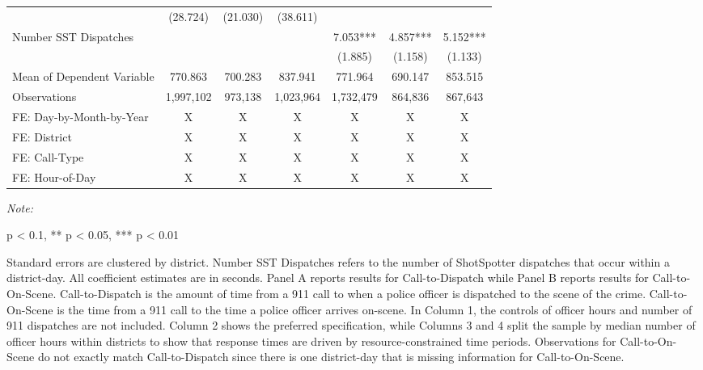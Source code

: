 \begin{table}[H]
\begin{threeparttable}
\begin{tabular}[t]{lcccccc}
\hspace{1em} & (28.724) & (21.030) & (38.611) &  &  & \\
\hspace{1em}Number SST Dispatches &  &  &  & 7.053*** & 4.857*** & 5.152***\\
\hspace{1em} &  &  &  & (1.885) & (1.158) & (1.133)\\
\hspace{1em}Mean of Dependent Variable & 770.863 & 700.283 & 837.941 & 771.964 & 690.147 & 853.515\\
\hspace{1em}Observations & 1,997,102 & 973,138 & 1,023,964 & 1,732,479 & 864,836 & 867,643\\
\midrule
FE: Day-by-Month-by-Year & X & X & X & X & X & X\\
FE: District & X & X & X & X & X & X\\
FE: Call-Type & X & X & X & X & X & X\\
FE: Hour-of-Day & X & X & X & X & X & X\\
\bottomrule
\end{tabular}
\begin{tablenotes}
\item \textit{Note: } 
\item * p < 0.1, ** p < 0.05, *** p < 0.01
\item Standard errors are clustered by district.                       Number SST Dispatches refers to the number of                      ShotSpotter dispatches that occur within a district-day.                      All coefficient estimates are in seconds. Panel A reports results for                      Call-to-Dispatch while Panel B reports results for Call-to-On-Scene.                      Call-to-Dispatch is the amount of time from a 911 call to                       when a police officer is dispatched to the scene of the crime.                      Call-to-On-Scene is the time from a 911 call to the time a police                      officer arrives on-scene. In Column 1, the controls of officer hours and number of                      911 dispatches are not included. Column 2 shows the preferred                      specification, while Columns 3 and 4 split the sample by median number                      of officer hours                      within districts to show that response times are driven by                      resource-constrained time periods. Observations for Call-to-On-Scene                      do not exactly match Call-to-Dispatch since there is one district-day                      that is missing information for Call-to-On-Scene.                   
\end{tablenotes}
\end{threeparttable}
\end{table}
